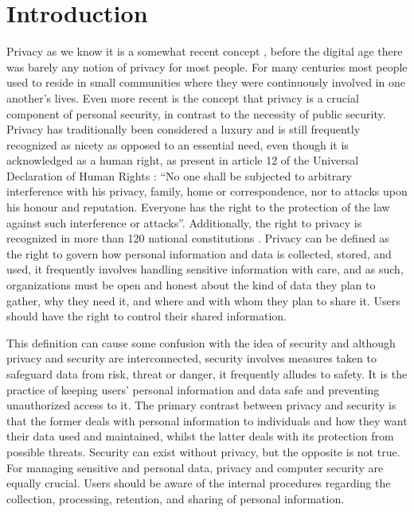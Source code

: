 %
%
\section{Introduction}\label{introduction}

Privacy as we know it is a somewhat recent concept \cite{vincent2016privacy, moore2017privacy},
before the digital age there was barely any notion of privacy for most
people. For many centuries most people used to reside in small communities
where they were continuously involved in one another's lives. Even more
recent is the concept that privacy is a crucial component of personal security,
in contrast to the necessity of public security. Privacy has traditionally been
considered a luxury and is still frequently recognized as nicety as opposed to an
essential need, even though it is acknowledged as a human right, as present
in article 12 of the Universal Declaration of Human Rights \cite{RooseveltUniversal}:
``No one shall be subjected to arbitrary interference with his privacy,
family, home or correspondence, nor to attacks upon his honour and reputation.
Everyone has the right to the protection of the law against such interference
or attacks''. Additionally, the right to privacy is recognized in more than 120 national
constitutions \cite{constitute2023constitutions}. Privacy can be defined \cite{InternationalWhat, SpiekermannEngineering}
as the right to govern how personal information and data is collected, stored,
and used, it frequently involves handling sensitive information with care,
and as such, organizations must be open and honest about the kind of data
they plan to gather, why they need it, and where and with whom they plan
to share it. Users should have the right to control their shared information.

This definition can cause some confusion with the idea of security \cite{HIVDifference}
and although privacy and security are interconnected, security involves
measures taken to safeguard data from risk, threat or danger, it frequently
alludes to safety. It is the practice of keeping users' personal information
and data safe and preventing unauthorized access to it. The primary contrast
between privacy and security is that the former deals with personal information
to individuals and how they want their data used and maintained, whilst
the latter deals with its protection from possible threats. Security can
exist without privacy, but the opposite is not true. For managing sensitive
and personal data, privacy and computer security are equally crucial. Users
should be aware of the internal procedures regarding the collection, processing,
retention, and sharing of personal information.

